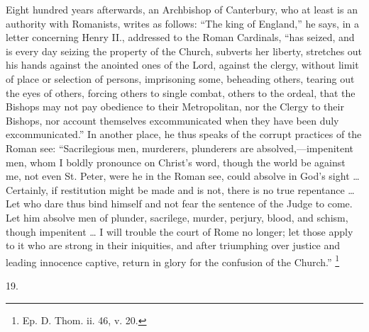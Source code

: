 Eight hundred years afterwards, an Archbishop of Canterbury, who at least is an authority with Romanists, writes as follows:
``The king of England,'' he says, in a letter concerning Henry
II., addressed to the Roman Cardinals, ``has seized, and is every
day seizing the property of the Church, subverts her liberty,
stretches out his hands against the anointed ones of the Lord, against
the clergy, without limit of place or selection of persons,
imprisoning some, beheading others, tearing out the eyes of others,
forcing others to single combat, others to the ordeal, that the
Bishops may not pay obedience to their Metropolitan, nor the Clergy to
their Bishops, nor account themselves excommunicated when they have
been duly excommunicated.'' In another place, he thus speaks of
the corrupt practices of the Roman see: ``Sacrilegious men,
murderers, plunderers are absolved,—impenitent men, whom I boldly
pronounce on Christ's word, though the world be against me, not even
St. Peter, were he in the Roman see, could absolve in God's sight …
Certainly, if restitution might be made and is not, there is no true
repentance … Let who dare thus bind himself and not fear the
sentence of the Judge to come. Let him absolve men of plunder,
sacrilege, murder, perjury, blood, and schism, though impenitent … I
will trouble the court of Rome no longer; let those apply to it who
are strong in their iniquities, and after triumphing over justice and
leading innocence captive, return in glory for the confusion of the
Church.'' \footnote{Ep. D. Thom. ii. 46, v. 20.}

19.

